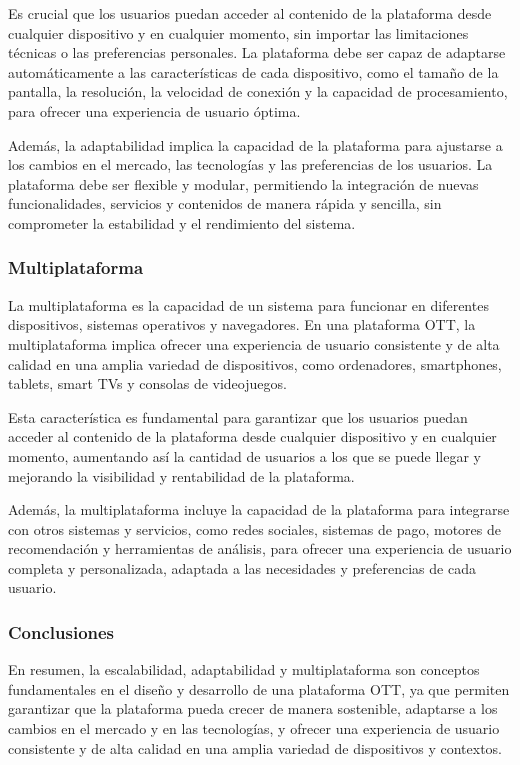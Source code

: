Es crucial que los usuarios puedan acceder al contenido de la plataforma desde cualquier dispositivo y en cualquier 
momento, sin importar las limitaciones técnicas o las preferencias personales. La plataforma debe ser capaz de 
adaptarse automáticamente a las características de cada dispositivo, como el tamaño de la pantalla, la resolución, 
la velocidad de conexión y la capacidad de procesamiento, para ofrecer una experiencia de usuario óptima.

Además, la adaptabilidad implica la capacidad de la plataforma para ajustarse a los cambios en el mercado, las 
tecnologías y las preferencias de los usuarios. La plataforma debe ser flexible y modular, permitiendo la integración 
de nuevas funcionalidades, servicios y contenidos de manera rápida y sencilla, sin comprometer la estabilidad y 
el rendimiento del sistema.

\subsubsection{Multiplataforma}
\label{subsec:fundamentos_teoricos_esc_adapt_multiplataforma}

La multiplataforma es la capacidad de un sistema para funcionar en diferentes dispositivos, sistemas operativos 
y navegadores. En una plataforma OTT, la multiplataforma implica ofrecer una experiencia de usuario consistente 
y de alta calidad en una amplia variedad de dispositivos, como ordenadores, smartphones, tablets, smart TVs y 
consolas de videojuegos.

Esta característica es fundamental para garantizar que los usuarios puedan acceder al contenido de la plataforma 
desde cualquier dispositivo y en cualquier momento, aumentando así la cantidad de usuarios a los que se puede llegar 
y mejorando la visibilidad y rentabilidad de la plataforma.

Además, la multiplataforma incluye la capacidad de la plataforma para integrarse con otros sistemas y servicios, 
como redes sociales, sistemas de pago, motores de recomendación y herramientas de análisis, para ofrecer una 
experiencia de usuario completa y personalizada, adaptada a las necesidades y preferencias de cada usuario.

\subsubsection{Conclusiones}
\label{subsec:fundamentos_teoricos_esc_adapt_conclusiones}

En resumen, la escalabilidad, adaptabilidad y multiplataforma son conceptos fundamentales en el diseño y 
desarrollo de una plataforma OTT, ya que permiten garantizar que la plataforma pueda crecer de manera sostenible, 
adaptarse a los cambios en el mercado y en las tecnologías, y ofrecer una experiencia de usuario consistente y de 
alta calidad en una amplia variedad de dispositivos y contextos.
